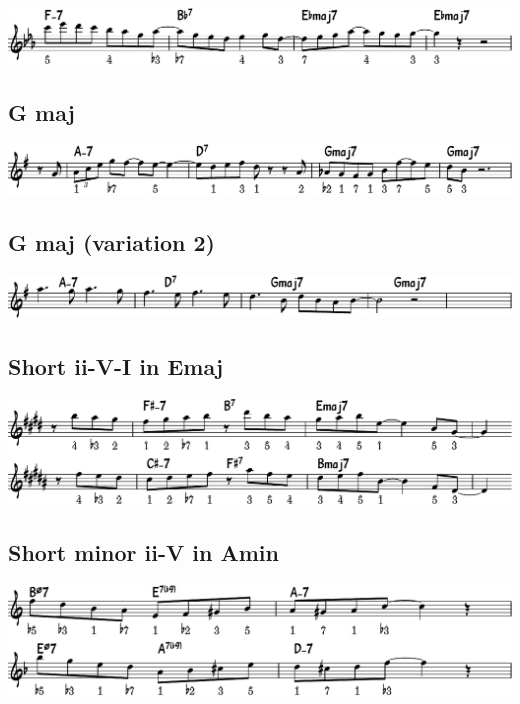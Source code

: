 \documentclass[11pt]{article}
\begin{document}
\begin{center}
\includegraphics[width=.98\linewidth]{e-flat.pdf}
\end{center}

\subsection{G maj}
\label{sec:org79cf24a}
\begin{center}
\includegraphics[width=.98\linewidth]{g_maj.pdf}
\end{center}

\subsection{G maj (variation 2)}
\label{sec:org877964c}
\begin{center}
\includegraphics[width=.98\linewidth]{g_maj_v2.pdf}
\end{center}

\subsection{Short ii-V-I in Emaj}
\label{sec:org933cdc6}
\begin{center}
\includegraphics[width=.98\linewidth]{short-ii-v-in-Emaj.pdf}
\end{center}

\subsection{Short minor ii-V in Amin}
\label{sec:org0a46a6b}
\begin{center}
\includegraphics[width=.98\linewidth]{short-ii-v-in-Amin.pdf}
\end{center}
\end{document}
